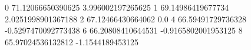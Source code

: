 0 71.12066650390625 3.996002197265625
1 69.14986419677734 2.0251998901367188
2 67.12466430664062 0.0
4 66.59491729736328 -0.5297470092773438
6 66.20808410644531 -0.9165802001953125
8 65.97024536132812 -1.1544189453125
